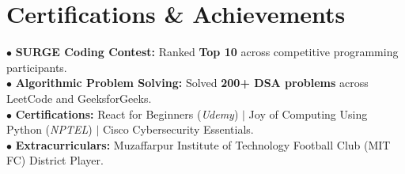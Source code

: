 \documentclass[letterpaper,10pt]{article}
\begin{document}
\section{Certifications \& Achievements}
\begin{itemize}[leftmargin=0.15in, label={}]
    \small{\item{
     $\bullet$ \textbf{SURGE Coding Contest:}{ Ranked \textbf{Top 10} across competitive programming participants.} \\
     $\bullet$ \textbf{Algorithmic Problem Solving:}{ Solved \textbf{200+ DSA problems} across LeetCode and GeeksforGeeks.} \\
     $\bullet$ \textbf{Certifications:}{ React for Beginners (\emph{Udemy}) $|$ Joy of Computing Using Python (\emph{NPTEL}) $|$ Cisco Cybersecurity Essentials.} \\
     $\bullet$ \textbf{Extracurriculars:}{ Muzaffarpur Institute of Technology Football Club (MIT FC) District Player.}
    }}
\end{itemize}
\end{document}
